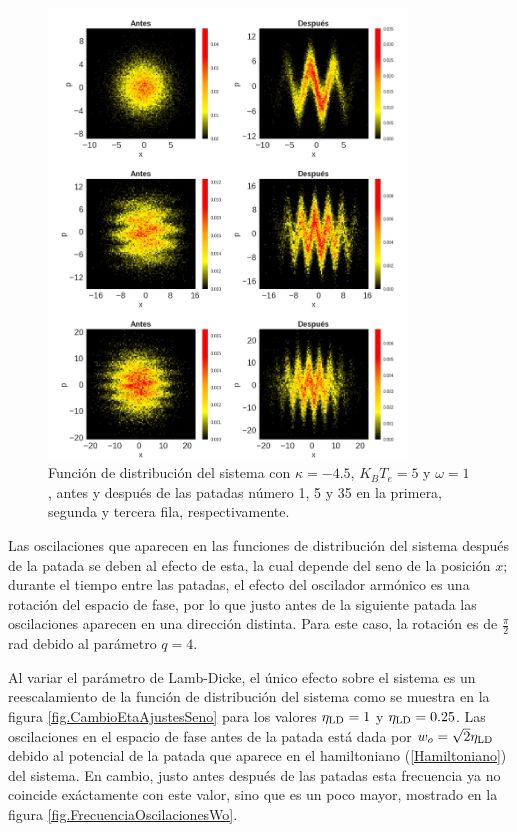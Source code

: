 \documentclass[letterpaper,12pt,oneside]{book}
\begin{document}
\begin{figure}[h!]
	\centering
	\label{fig:DistFunctions}
	\includegraphics[width=0.85\textwidth]{last_figures/dist_functions.jpg}
	\caption{Funci\'on de distribuci\'on del sistema con $\kappa=-4.5$, $K_BT_e = 5$ y $\omega=1$, antes y despu\'es de las patadas n\'umero 1, 5 y 35 en la primera, segunda y tercera fila, respectivamente.}
\end{figure}

Las oscilaciones que aparecen en las funciones de distribuci\'on del sistema despu\'es de la patada se deben al efecto de esta, la cual depende del seno de la posici\'on $x$; durante el tiempo entre las patadas, el efecto del oscilador arm\'onico es una rotaci\'on del espacio de fase, por lo que justo antes de la siguiente patada las oscilaciones aparecen en una direcci\'on distinta. Para este caso, la rotaci\'on es de $\frac{\pi}{2}$ rad debido al par\'ametro $q=4$.


Al variar el par\'ametro de Lamb-Dicke, el \'unico efecto sobre el sistema es un reescalamiento de la funci\'on de distribuci\'on del sistema como se muestra en la figura \ref{fig.CambioEtaAjustesSeno} para los valores $\eta_{\rm LD} = 1$ y $\eta_{\rm LD} = 0.25$. Las oscilaciones en el espacio de fase antes de la patada est\'a dada por $w_o = \sqrt{2}\eta_{\rm LD}$ debido al potencial de la patada que aparece en el hamiltoniano (\ref{Hamiltoniano}) del sistema. En cambio, justo antes despu\'es de las patadas esta frecuencia ya no coincide ex\'actamente con este valor, sino que es un poco mayor, mostrado en la figura \ref{fig.FrecuenciaOscilacionesWo}.
\end{document}
